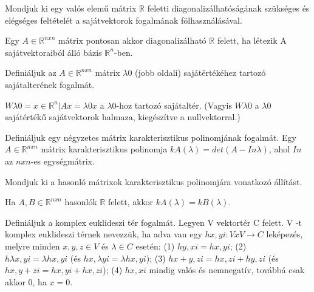 \begin{frame}
  \begin{tcolorbox}[title={35}]
    Mondjuk ki egy valós elemű mátrix $\mathbb{R}$ feletti diagonalizálhatóságának szükséges és elégséges feltételét a sajátvektorok fogalmának fölhasználásával.

  \tcblower
Egy $A \in \mathbb{R}^{n x n}$ mátrix pontosan akkor diagonalizálható $\mathbb{R}$ felett, ha létezik A sajátvektoraiból álló bázis $\mathbb{R}^n$-ben. 
  \end{tcolorbox}
\end{frame}



\begin{frame}
  \begin{tcolorbox}[title={36}]
     Definiáljuk az $A \in \mathbb{R}^{n x n}$ mátrix ${\lambda}0$ (jobb oldali) sajátértékéhez tartozó sajátalterének fogalmát.

  \tcblower
$W{\lambda}0 = {x \in \mathbb{R}^n |Ax = {\lambda}0x}$ a ${\lambda}0$-hoz tartozó sajátaltér. (Vagyis $W{\lambda}0$ a ${\lambda}0$ sajátértékű sajátvektorok halmaza, kiegészítve a nullvektorral.)

  \end{tcolorbox}
\end{frame}

\begin{frame}
  \begin{tcolorbox}[title={37}]
    Definiáljuk egy négyzetes mátrix karakterisztikus polinomjának fogalmát.
  \tcblower
Egy $A \in \mathbb{R}^{n x n}$ mátrix karakterisztikus polinomja $kA({\lambda}) = det(A-In{\lambda})$, ahol $In$ az $nxn$-es egységmátrix.

  \end{tcolorbox}
\end{frame}


\begin{frame}
  \begin{tcolorbox}[title={38}]
    Mondjuk ki a hasonló mátrixok karakterisztikus polinomjára vonatkozó állítást.

  \tcblower
Ha $A,B \in \mathbb{R}^{n x n}$ hasonlók $\mathbb{R}$ felett, akkor $kA({\lambda}) = kB({\lambda})$.

  \end{tcolorbox}
\end{frame}


\begin{frame}
  \begin{tcolorbox}[title={39}]
   Definiáljuk a komplex euklideszi tér fogalmát.
  \tcblower
Legyen V vektortér C felett. V -t komplex euklideszi térnek nevezzük, ha adva van egy $hx,yi : V x V {\rightarrow} C$ leképezés, melyre minden $x,y,z \in V$ és ${\lambda} \in C$ esetén: (1) $hy,xi = hx,yi$; (2) $h{\lambda}x,yi = {\lambda}hx,yi$ (és $hx,{\lambda}yi = {\lambda}hx,yi$); (3) $hx + y,zi = hx,zi + hy,zi$ (és $hx,y + zi = hx,yi + hx,zi$); (4) $hx,xi$ mindig valós és nemnegatív, továbbá csak akkor 0, ha $x = 0$.

  \end{tcolorbox}
\end{frame}


